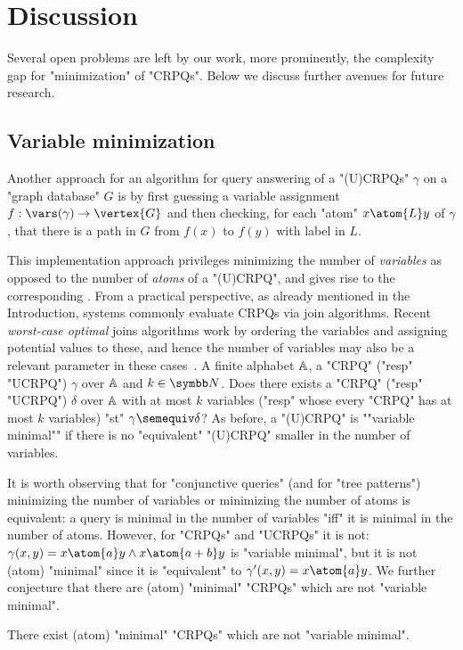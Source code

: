 \section{Discussion}
\AP\label{sec:discussion}

Several open problems are left by our work, more prominently, the complexity gap for "minimization" of "CRPQs". Below we discuss further avenues for future research.

\subsection{Variable minimization}
\AP\label{sec:varmin}

Another approach for an algorithm for query answering of a "(U)CRPQs" $\gamma$ on a "graph database" $G$ is by first guessing a variable assignment $f: \vars(\gamma) \to \vertex{G}$ and then checking, for each "atom" $x \atom{L} y$ of $\gamma$, that there is a path in $G$ from $f(x)$ to $f(y)$ with label in $L$. 

This implementation approach privileges minimizing the number of \emph{variables} as opposed to the number of \emph{atoms} of a "(U)CRPQ", and gives rise to the corresponding . From a practical perspective, as already mentioned in the Introduction, systems commonly evaluate CRPQs via join algorithms. Recent \emph{worst-case optimal} joins algorithms work by ordering the variables and assigning potential values to these, and hence the number of variables may also be a relevant parameter in these cases~\cite{cucumides-icdt23,milleniumDB24}. 
{A finite alphabet $\mathbb{A}$, a  "CRPQ" ("resp" "UCRPQ") $\gamma$ over $\mathbb{A}$ and $k \in \N$.}
{Does there exists a "CRPQ" ("resp" "UCRPQ") $\delta$ over $\mathbb{A}$ with at most $k$ variables 
("resp" whose every "CRPQ" has at most $k$ variables) "st" $\gamma \semequiv \delta$?}
As before, a "(U)CRPQ" is \AP""variable minimal"" if there is no "equivalent" "(U)CRPQ" smaller in the number of variables.

It is worth observing that for "conjunctive queries" (and for "tree patterns") minimizing the number of variables or minimizing the number of atoms is equivalent: a query is minimal in the number of variables "iff" it is minimal in the number of atoms.
However, for "CRPQs" and "UCRPQs" it is not: $\gamma(x,y) = x \atom{a} y \land x \atom{a+b} y$ is "variable minimal", but it is not (atom) "minimal" since it is "equivalent" to $\gamma'(x,y) = x \atom{a} y$. We further conjecture that there are (atom) "minimal" "CRPQs" which are not "variable minimal".
\begin{conjecture}
  There exist (atom) "minimal" "CRPQs" which are not "variable minimal".
\end{conjecture}

